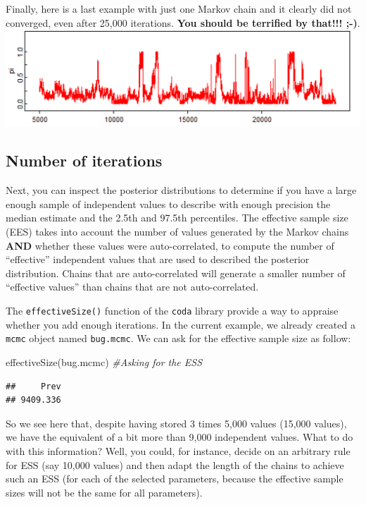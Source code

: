 \documentclass[
]{book}
\newenvironment{Shaded}{\begin{snugshade}}{\end{snugshade}}
\newcommand{\CommentTok}[1]{\textcolor[rgb]{0.56,0.35,0.01}{\textit{#1}}}
\newcommand{\FunctionTok}[1]{\textcolor[rgb]{0.00,0.00,0.00}{#1}}
\newcommand{\NormalTok}[1]{#1}
\begin{document}
Finally, here is a last example with just one Markov chain and it
clearly did not converged, even after 25,000 iterations. \textbf{You
should be terrified by that!!! ;-)}.\\
\includegraphics{Figures/non-conv chain.png}

\hypertarget{number-of-iterations}{%
\subsection{Number of iterations}\label{number-of-iterations}}

Next, you can inspect the posterior distributions to determine if you
have a large enough sample of independent values to describe with enough
precision the median estimate and the 2.5th and 97.5th percentiles. The
effective sample size (EES) takes into account the number of values
generated by the Markov chains \textbf{AND} whether these values were
auto-correlated, to compute the number of ``effective'' independent
values that are used to described the posterior distribution. Chains
that are auto-correlated will generate a smaller number of ``effective
values'' than chains that are not auto-correlated.

The \texttt{effectiveSize()} function of the \texttt{coda} library
provide a way to appraise whether you add enough iterations. In the
current example, we already created a \texttt{mcmc} object named
\texttt{bug.mcmc}. We can ask for the effective sample size as follow:

\begin{Shaded}
\begin{Highlighting}[]
\FunctionTok{effectiveSize}\NormalTok{(bug.mcmc)         }\CommentTok{\#Asking for the ESS}
\end{Highlighting}
\end{Shaded}

\begin{verbatim}
##     Prev 
## 9409.336
\end{verbatim}

So we see here that, despite having stored 3 times 5,000 values (15,000
values), we have the equivalent of a bit more than 9,000 independent
values. What to do with this information? Well, you could, for instance,
decide on an arbitrary rule for ESS (say 10,000 values) and then adapt
the length of the chains to achieve such an ESS (for each of the
selected parameters, because the effective sample sizes will not be the
same for all parameters).
\end{document}

